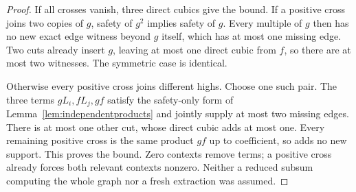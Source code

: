 \documentclass[11pt]{article}
\theoremstyle{definition}
\theoremstyle{remark}
\begin{document}
\begin{proof}
If all crosses vanish, three direct cubics give the bound. If a positive cross joins two copies of $g$, safety of $g^2$ implies safety of $g$. Every multiple of $g$ then has no new exact edge witness beyond $g$ itself, which has at most one missing edge. Two cuts already insert $g$, leaving at most one direct cubic from $f$, so there are at most two witnesses. The symmetric case is identical.

Otherwise every positive cross joins different highs. Choose one such pair. The three terms $gL_i,fL_j,gf$ satisfy the safety-only form of Lemma~\ref{lem:independentproducts} and jointly supply at most two missing edges. There is at most one other cut, whose direct cubic adds at most one. Every remaining positive cross is the same product $gf$ up to coefficient, so adds no new support. This proves the bound. Zero contexts remove terms; a positive cross already forces both relevant contexts nonzero. Neither a reduced subsum computing the whole graph nor a fresh extraction was assumed.
\end{proof}
\end{document}
